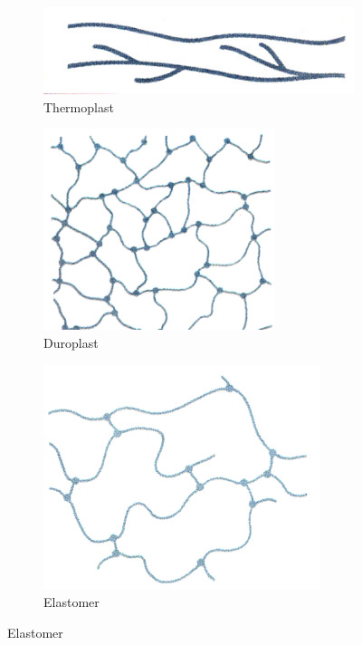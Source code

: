 \begin{figure}[htbp]
	\centering
	\begin{subfigure}{0.25\linewidth}
		\includegraphics[width=0.9\linewidth]{images/7_Thermoplast}
		\caption{Thermoplast}
	\end{subfigure}
	\quad
	\begin{subfigure}{0.25\linewidth}
		\includegraphics[width=0.9\linewidth]{images/7_Duroplast}
		\caption{Duroplast}
	\end{subfigure}
	\quad
	\begin{subfigure}{0.25\linewidth}
		\includegraphics[width=0.9\linewidth]{images/7_Elastomer}
		\caption{Elastomer}
	\end{subfigure}
\end{figure}

